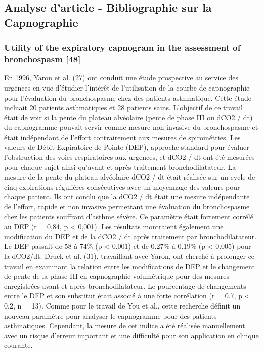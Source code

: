 \documentclass[12pt,]{article}
\begin{document}
\pagebreak

\hypertarget{analyse-darticle---bibliographie-sur-la-capnographie}{%
\subsection{Analyse d'article - Bibliographie sur la
Capnographie}\label{analyse-darticle---bibliographie-sur-la-capnographie}}

\hypertarget{utility-of-the-expiratory-capnogram-in-the-assessment-of-bronchospasm-yaron1996utility}{%
\subsubsection{\texorpdfstring{Utility of the expiratory capnogram in
the assessment of bronchospasm
{[}\protect\hyperlink{ref-yaron1996utility}{48}{]}}{Utility of the expiratory capnogram in the assessment of bronchospasm {[}48{]}}}\label{utility-of-the-expiratory-capnogram-in-the-assessment-of-bronchospasm-yaron1996utility}}

En 1996, Yaron et al. (27) ont conduit une étude prospective au service
des urgences en vue d'étudier l'intérêt de l'utilisation de la courbe de
capnographie pour l'évaluation du bronchospasme chez des patients
asthmatique. Cette étude incluait 20 patients asthmatiques et 28
patients sains. L'objectif de ce travail était de voir si la pente du
plateau alvéolaire (pente de phase III ou dCO2 / dt) du capnogramme
pouvait servir comme mesure non invasive du bronchospasme et était
indépendant de l'effort contrairement aux mesures de spirométries. Les
valeurs de Débit Expiratoire de Pointe (DEP), approche standard pour
évaluer l'obstruction des voies respiratoires aux urgences, et dCO2 / dt
ont été mesurées pour chaque sujet ainsi qu'avant et après traitement
bronchodilatateur. La mesure de la pente du plateau alvéolaire dCO2 / dt
était réalisée sur un cycle de cinq expirations régulières consécutives
avec un moyennage des valeurs pour chaque patient. Ils ont conclu que la
dCO2 / dt était une mesure indépendante de l'effort, rapide et non
invasive permettant une évaluation du bronchospasme chez les patients
souffrant d'asthme sévère. Ce paramètre était fortement corrélé au DEP
(r = 0,84, p \textless{} 0,001). Les résultats montraient également une
modification du DEP et de la dCO2 / dt après traitement par
bronchodilatateur. Le DEP passait de 58 à 74\% (p \textless{} 0.001) et
de 0.27\% à 0.19\% (p \textless{} 0.005) pour la dCO2/dt. Druck et al.
(31), travaillant avec Yaron, ont cherché à prolonger ce travail en
examinant la relation entre les modifications de DEP et le changement de
pente de la phase III en capnographie volumétrique pour des mesures
enregistrées avant et après bronchodilatateur. Le pourcentage de
changements entre le DEP et son substitut était associé à une forte
corrélation (r = 0.7, p \textless{} 0.2, n = 13). Comme pour le travail
de You et al., cette recherche définit un nouveau paramètre pour
analyser le capnogramme pour des patients asthmatiques. Cependant, la
mesure de cet indice a été réalisée manuellement avec un risque d'erreur
important et une difficulté pour son application en clinque courante.
\end{document}
